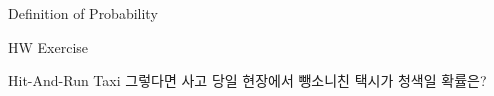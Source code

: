 \begin{edXchapter}{Definition of Probability}
\begin{edXsection}{HW Exercise}
\begin{edXvertical}
\begin{edXproblem}{Hit-And-Run Taxi}
그렇다면 사고 당일 현장에서 뺑소니친 택시가 청색일 확률은?
\end{edXproblem}

\end{edXvertical}
\end{edXsection}
\end{edXchapter}









